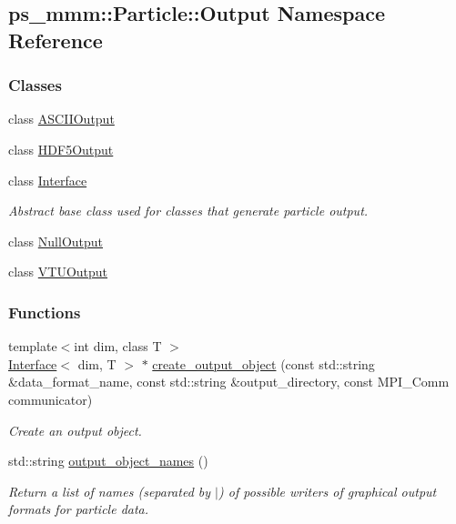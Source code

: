 \hypertarget{namespaceps__mmm_1_1_particle_1_1_output}{}\subsection{ps\+\_\+mmm\+:\+:Particle\+:\+:Output Namespace Reference}
\label{namespaceps__mmm_1_1_particle_1_1_output}
\subsubsection*{Classes}
\begin{DoxyCompactItemize}
\item 
class \hyperlink{classps__mmm_1_1_particle_1_1_output_1_1_a_s_c_i_i_output}{A\+S\+C\+I\+I\+Output}
\item 
class \hyperlink{classps__mmm_1_1_particle_1_1_output_1_1_h_d_f5_output}{H\+D\+F5\+Output}
\item 
class \hyperlink{classps__mmm_1_1_particle_1_1_output_1_1_interface}{Interface}
\begin{DoxyCompactList}\small\item\em Abstract base class used for classes that generate particle output. \end{DoxyCompactList}\item 
class \hyperlink{classps__mmm_1_1_particle_1_1_output_1_1_null_output}{Null\+Output}
\item 
class \hyperlink{classps__mmm_1_1_particle_1_1_output_1_1_v_t_u_output}{V\+T\+U\+Output}
\end{DoxyCompactItemize}
\subsubsection*{Functions}
\begin{DoxyCompactItemize}
\item 
{\footnotesize template$<$int dim, class T $>$ }\\\hyperlink{classps__mmm_1_1_particle_1_1_output_1_1_interface}{Interface}$<$ dim, T $>$ $\ast$ \hyperlink{namespaceps__mmm_1_1_particle_1_1_output_afd11a0d7eafa19b5279e3bd953b915c4}{create\+\_\+output\+\_\+object} (const std\+::string \&data\+\_\+format\+\_\+name, const std\+::string \&output\+\_\+directory, const M\+P\+I\+\_\+\+Comm communicator)
\begin{DoxyCompactList}\small\item\em Create an output object. \end{DoxyCompactList}\item 
std\+::string \hyperlink{namespaceps__mmm_1_1_particle_1_1_output_ad648ebb9d2718d0d82e2a76a2565ca9a}{output\+\_\+object\+\_\+names} ()
\begin{DoxyCompactList}\small\item\em Return a list of names (separated by \textquotesingle{}$\vert$\textquotesingle{}) of possible writers of graphical output formats for particle data. \end{DoxyCompactList}\end{DoxyCompactItemize}


